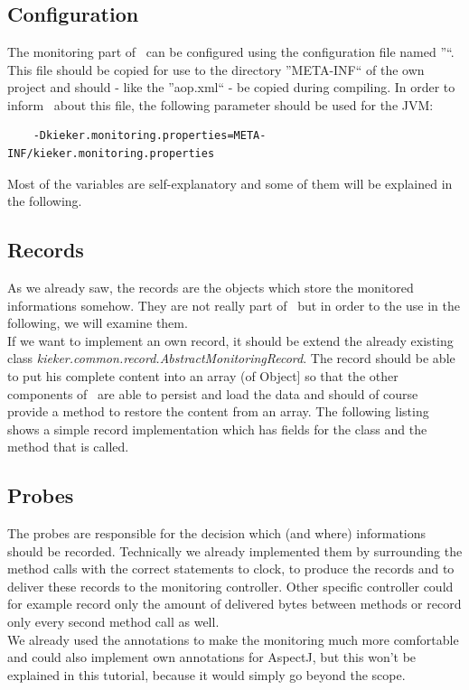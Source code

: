   \chapter{\KiekerMonitoring}
    \section{Configuration}
      The monitoring part of \Kieker\ can be configured using the configuration file named ''\monitoringPropertiesFile``. This file should be copied for use to the directory ''META-INF`` of the own project and should - like the ''aop.xml`` - be copied during compiling. In order to inform \Kieker\ about this file, the following parameter should be used for the JVM:
      \begin{lstlisting}
	-Dkieker.monitoring.properties=META-INF/kieker.monitoring.properties
      \end{lstlisting}
      Most of the variables are self-explanatory and some of them will be explained in the following.

    \section{Records}
      As we already saw, the records are the objects which store the monitored informations somehow. They are not really part of \KiekerMonitoring\ but in order to the use in the following, we will examine them.\\
      If we want to implement an own record, it should be extend the already existing class \textit{kieker.common.record.AbstractMonitoringRecord}. The record should be able to put his complete content into an array (of Object] so that the other components of \Kieker\ are able to persist and load the data and should of course provide a method to restore the content from an array. The following listing shows a simple record implementation which has fields for the class and the method that is called.
      \setJavaCodeListing
      \lstset{caption=MyRecord.java}
      

    \section{Probes}
      The probes are responsible for the decision which (and where) informations should be recorded. Technically we already implemented them by surrounding the method calls with the correct statements to clock, to produce the records and to deliver these records to the monitoring controller. Other specific controller could for example record only the amount of delivered bytes between methods or record only every second method call as well.\\
      We already used the annotations to make the monitoring much more comfortable and could also implement own annotations for AspectJ, but this won't be explained in this tutorial, because it would simply go beyond the scope.

